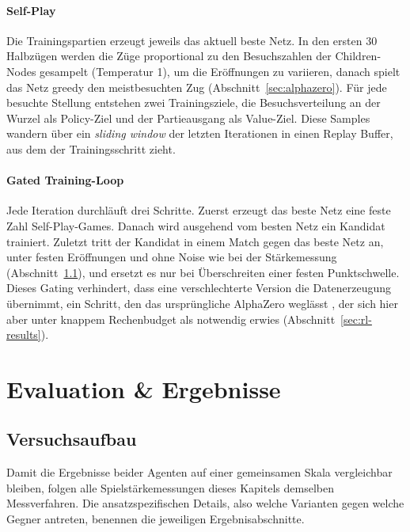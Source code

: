 \documentclass[
  a4paper, 12pt,
  parskip=half,
  headings=small,
  bibliography=totoc
]{scrartcl}
\begin{document}
\paragraph{Self-Play}
Die Trainingspartien erzeugt jeweils das aktuell beste Netz. In den ersten 30 Halbzügen werden die Züge proportional zu den Besuchszahlen der Children-Nodes gesampelt (Temperatur 1), um die Eröffnungen zu variieren, danach spielt das Netz greedy den meistbesuchten Zug (Abschnitt~\ref{sec:alphazero}). Für jede besuchte Stellung entstehen zwei Trainingsziele, die Besuchsverteilung an der Wurzel als Policy-Ziel und der Partieausgang als Value-Ziel. Diese Samples wandern über ein \emph{sliding window} der letzten Iterationen in einen Replay Buffer, aus dem der Trainingsschritt zieht.

\paragraph{Gated Training-Loop}
Jede Iteration durchläuft drei Schritte. Zuerst erzeugt das beste Netz eine feste Zahl Self-Play-Games. Danach wird ausgehend vom besten Netz ein Kandidat trainiert. Zuletzt tritt der Kandidat in einem Match gegen das beste Netz an, unter festen Eröffnungen und ohne Noise wie bei der Stärkemessung (Abschnitt~\ref{sec:eval-setup}), und ersetzt es nur bei Überschreiten einer festen Punktschwelle. Dieses Gating verhindert, dass eine verschlechterte Version die Datenerzeugung übernimmt, ein Schritt, den das ursprüngliche AlphaZero weglässt \autocite{silver2018}, der sich hier aber unter knappem Rechenbudget als notwendig erwies (Abschnitt~\ref{sec:rl-results}).

\section{Evaluation \& Ergebnisse}\label{sec:eval}

\subsection{Versuchsaufbau}\label{sec:eval-setup}
Damit die Ergebnisse beider Agenten auf einer gemeinsamen Skala vergleichbar
bleiben, folgen alle Spielstärkemessungen dieses Kapitels demselben Messverfahren.
Die ansatzspezifischen Details, also welche Varianten gegen welche Gegner antreten,
benennen die jeweiligen Ergebnisabschnitte.
\end{document}
